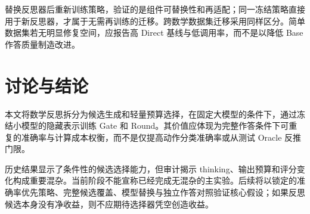 \documentclass[11pt]{article}
\begin{document}
\begin{table}[t]
\centering\small
\caption{后续数学验证清单。只报告实际完成的项目。}
\label{tab:next}
\end{table}

替换反思器后重新训练策略，验证的是组件可替换性和再适配；同一冻结策略直接用于新反思器，才属于无需再训练的迁移。跨数学数据集迁移采用同样区分。简单数据集若无明显修复空间，应报告高 Direct 基线与低调用率，而不是以降低 Base 作答质量制造改进。

\section{讨论与结论}
本文将数学反思拆分为候选生成和轻量预算选择，在固定大模型的条件下，通过冻结小模型的隐藏表示训练 Gate 和 Round。其价值应体现为完整作答条件下可重复的准确率与计算成本权衡，而不是仅提高动作分类准确率或从测试 Oracle 反推门限。

历史结果显示了条件性的候选选择能力，但审计揭示 thinking、输出预算和评分变化构成重要混杂。当前阶段不能宣称已经完成无混杂的主实验。后续将以锁定的准确率优先策略、完整候选覆盖、模型替换与独立作答对照验证核心假设；如果反思候选本身没有净收益，则不应期待选择器凭空创造收益。
\end{document}
